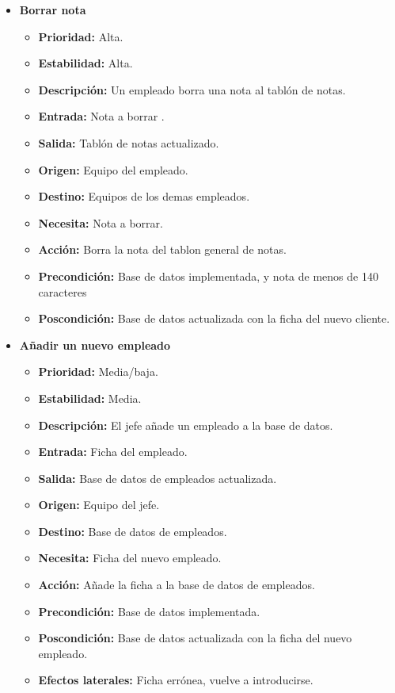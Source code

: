 \documentclass[spanish,a4paper,11pt, twoside]{report}	%
\begin{document}
\begin{itemize}
\begin{itemize}
		\end{itemize}%


		\item \textbf{Borrar nota}  %

		\begin{itemize}
			\item \textbf{Prioridad: }Alta.
			\item \textbf{Estabilidad: }Alta.
			\item \textbf{Descripción: }Un empleado borra una nota al tablón de notas.
			\item \textbf{Entrada: } Nota a borrar .
			\item \textbf{Salida: }Tablón de notas actualizado.
			\item \textbf{Origen: }Equipo del empleado.
			\item \textbf{Destino: }Equipos de los demas empleados. 
			\item \textbf{Necesita: }Nota a borrar. 
			\item \textbf{Acción: }Borra la nota del tablon general de notas.
			\item \textbf{Precondición: }Base de datos implementada, y nota de menos de 140 caracteres
			\item \textbf{Poscondición: }Base de datos actualizada con la ficha del nuevo cliente. 


		\end{itemize}%


		\item \textbf{Añadir un nuevo empleado}  %

		\begin{itemize}
			\item \textbf{Prioridad: }Media/baja.
			\item \textbf{Estabilidad: }Media.
			\item \textbf{Descripción: }El jefe añade un empleado a la base de datos.
			\item \textbf{Entrada: } Ficha del empleado.
			\item \textbf{Salida: }Base de datos de empleados actualizada.
			\item \textbf{Origen: }Equipo del jefe.
			\item \textbf{Destino: }Base de datos de empleados. 
			\item \textbf{Necesita: }Ficha del nuevo empleado. 
			\item \textbf{Acción: }Añade la ficha a la base de datos de empleados.
			\item \textbf{Precondición: }Base de datos implementada.
			\item \textbf{Poscondición: }Base de datos actualizada con la ficha del nuevo empleado. 
			\item \textbf{Efectos laterales: } Ficha errónea, vuelve a introducirse.


\end{itemize}
\end{itemize}
\end{document}
